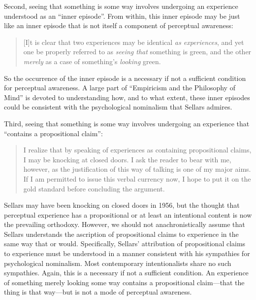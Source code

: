 \documentclass[12pt]{article}
\begin{document}
Second, seeing that something is some way involves undergoing an experience understood as an ``inner episode''. From within, this inner episode may be just like an inner episode that is not itself a component of perceptual awareness:
    \begin{quote}
        [I]t is clear that two experiences may be identical \emph{as experiences}, and yet one be properly referred to as \emph{seeing that} something is green, and the other \emph{merely} as a case of something's \emph{looking} green.
    \end{quote}
    So the occurrence of the inner episode is a necessary if not a sufficient condition for perceptual awareness. A large part of ``Empiricism and the Philosophy of Mind'' is devoted to understanding how, and to what extent, these inner episodes could be consistent with the psychological nominalism that Sellars admires.

Third, seeing that something is some way involves undergoing an experience that ``contains a propositional claim'':
    \begin{quote}
        I realize that by speaking of experiences as containing propositional claims, I may be knocking at closed doors. I ask the reader to bear with me, however, as the justification of this way of talking is one of my major aims. If I am permitted to issue this verbal currency now, I hope to put it on the gold standard before concluding the argument.
    \end{quote}
    Sellars may have been knocking on closed doors in 1956, but the thought that perceptual experience has a propositional or at least an intentional content is now the prevailing orthodoxy. However, we should not anachronistically assume that Sellars understands the ascription of propositional claims to experience in the same way that \citet[]{Harman:1990lm} or \citet[]{Tye:2000vn} would. Specifically, Sellars' attribution of propositional claims to experience must be understood in a manner consistent with his sympathies for psychological nominalism. Most contemporary intentionalists share no such sympathies. Again, this is a necessary if not a sufficient condition. An experience of something merely looking some way contains a propositional claim---that the thing is that way---but is not a mode of perceptual awareness.
\end{document}
